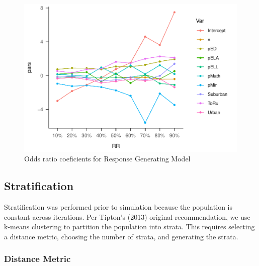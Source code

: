 \documentclass[man,floatsintext]{apa6}
\theoremstyle{definition}
\theoremstyle{definition}
\theoremstyle{definition}
\theoremstyle{remark}
\begin{document}
\begin{figure}
\centering
\includegraphics{GenSamp_Paper_files/figure-latex/fig-RGM-Pars-1.pdf}
\caption{\label{fig:fig-RGM-Pars}Odds ratio coeficients for Response
Generating Model}
\end{figure}

\hypertarget{stratification}{%
\subsection{Stratification}\label{stratification}}

Stratification was performed prior to simulation because the population
is constant across iterations. Per Tipton's (2013) original
recommendation, we use k-means clustering to partition the population
into strata. This requires selecting a distance metric, choosing the
number of strata, and generating the strata.

\hypertarget{distance-metric-1}{%
\subsubsection{Distance Metric}\label{distance-metric-1}}
\end{document}
